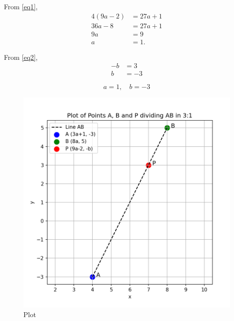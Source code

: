 \documentclass[12pt]{article}
\begin{document}
From \eqref{eq1},  
\begin{align}
4(9a - 2) &= 27a + 1 \\[6pt]
36a - 8 &= 27a + 1 \\[6pt]
9a &= 9 \\[6pt]
a &= 1.
\end{align}

From \eqref{eq2},  
\begin{align}
-b &= 3 \\[6pt]
b &= -3
\end{align}

\[
\boxed{a = 1, \quad b = -3}
\]

\begin{figure}[H]\centering
\includegraphics[width=1\columnwidth]{figs/plt.png}
\caption{Plot}
\label{fig:plt}
\end{figure}
\end{document}

